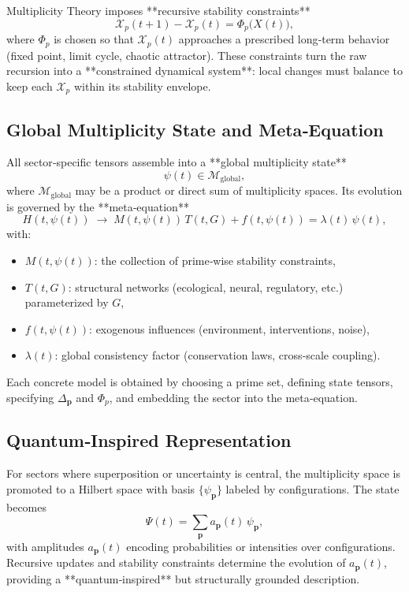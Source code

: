 \documentclass[11pt]{article}
\begin{document}
Multiplicity Theory imposes **recursive stability constraints**
\[
\mathcal{X}_p(t+1) - \mathcal{X}_p(t) = \Phi_p\big(X(t)\big),
\]
where \(\Phi_p\) is chosen so that \(\mathcal{X}_p(t)\) approaches a prescribed long‑term behavior (fixed point, limit cycle, chaotic attractor). These constraints turn the raw recursion into a **constrained dynamical system**: local changes must balance to keep each \(\mathcal{X}_p\) within its stability envelope.

\subsection{Global Multiplicity State and Meta‑Equation}

All sector‑specific tensors assemble into a **global multiplicity state**
\[
\psi(t) \in \mathcal{M}_{\text{global}},
\]
where \(\mathcal{M}_{\text{global}}\) may be a product or direct sum of multiplicity spaces. Its evolution is governed by the **meta‑equation**
\[
H(t,\psi(t)) \;\to\; M(t,\psi(t))\,T(t,G) + f(t,\psi(t)) = \lambda(t)\,\psi(t),
\]
with:
\begin{itemize}
    \item \(M(t,\psi(t))\): the collection of prime‑wise stability constraints,
    \item \(T(t,G)\): structural networks (ecological, neural, regulatory, etc.) parameterized by \(G\),
    \item \(f(t,\psi(t))\): exogenous influences (environment, interventions, noise),
    \item \(\lambda(t)\): global consistency factor (conservation laws, cross‑scale coupling).
\end{itemize}

Each concrete model is obtained by choosing a prime set, defining state tensors, specifying \(\Delta_{\mathbf{p}}\) and \(\Phi_p\), and embedding the sector into the meta‑equation.

\subsection{Quantum‑Inspired Representation}

For sectors where superposition or uncertainty is central, the multiplicity space is promoted to a Hilbert space with basis \(\{\psi_{\mathbf{p}}\}\) labeled by configurations. The state becomes
\[
\Psi(t) = \sum_{\mathbf{p}} a_{\mathbf{p}}(t)\,\psi_{\mathbf{p}},
\]
with amplitudes \(a_{\mathbf{p}}(t)\) encoding probabilities or intensities over configurations. Recursive updates and stability constraints determine the evolution of \(a_{\mathbf{p}}(t)\), providing a **quantum‑inspired** but structurally grounded description.
\end{document}
